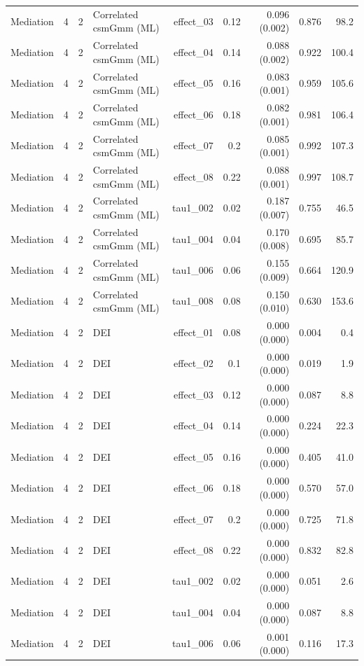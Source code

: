 \begin{longtable}{lcclrrrrr}
Mediation & 4 & 2 & Correlated csmGmm (ML) & effect\_03 & 0.12 & 0.096 (0.002) & 0.876 & 98.2\\
Mediation & 4 & 2 & Correlated csmGmm (ML) & effect\_04 & 0.14 & 0.088 (0.002) & 0.922 & 100.4\\
Mediation & 4 & 2 & Correlated csmGmm (ML) & effect\_05 & 0.16 & 0.083 (0.001) & 0.959 & 105.6\\
Mediation & 4 & 2 & Correlated csmGmm (ML) & effect\_06 & 0.18 & 0.082 (0.001) & 0.981 & 106.4\\
Mediation & 4 & 2 & Correlated csmGmm (ML) & effect\_07 & 0.2 & 0.085 (0.001) & 0.992 & 107.3\\
Mediation & 4 & 2 & Correlated csmGmm (ML) & effect\_08 & 0.22 & 0.088 (0.001) & 0.997 & 108.7\\
Mediation & 4 & 2 & Correlated csmGmm (ML) & tau1\_002 & 0.02 & 0.187 (0.007) & 0.755 & 46.5\\
Mediation & 4 & 2 & Correlated csmGmm (ML) & tau1\_004 & 0.04 & 0.170 (0.008) & 0.695 & 85.7\\
Mediation & 4 & 2 & Correlated csmGmm (ML) & tau1\_006 & 0.06 & 0.155 (0.009) & 0.664 & 120.9\\
Mediation & 4 & 2 & Correlated csmGmm (ML) & tau1\_008 & 0.08 & 0.150 (0.010) & 0.630 & 153.6\\
Mediation & 4 & 2 & DEI & effect\_01 & 0.08 & 0.000 (0.000) & 0.004 & 0.4\\
Mediation & 4 & 2 & DEI & effect\_02 & 0.1 & 0.000 (0.000) & 0.019 & 1.9\\
Mediation & 4 & 2 & DEI & effect\_03 & 0.12 & 0.000 (0.000) & 0.087 & 8.8\\
Mediation & 4 & 2 & DEI & effect\_04 & 0.14 & 0.000 (0.000) & 0.224 & 22.3\\
Mediation & 4 & 2 & DEI & effect\_05 & 0.16 & 0.000 (0.000) & 0.405 & 41.0\\
Mediation & 4 & 2 & DEI & effect\_06 & 0.18 & 0.000 (0.000) & 0.570 & 57.0\\
Mediation & 4 & 2 & DEI & effect\_07 & 0.2 & 0.000 (0.000) & 0.725 & 71.8\\
Mediation & 4 & 2 & DEI & effect\_08 & 0.22 & 0.000 (0.000) & 0.832 & 82.8\\
Mediation & 4 & 2 & DEI & tau1\_002 & 0.02 & 0.000 (0.000) & 0.051 & 2.6\\
Mediation & 4 & 2 & DEI & tau1\_004 & 0.04 & 0.000 (0.000) & 0.087 & 8.8\\
Mediation & 4 & 2 & DEI & tau1\_006 & 0.06 & 0.001 (0.000) & 0.116 & 17.3\\

\end{longtable}
